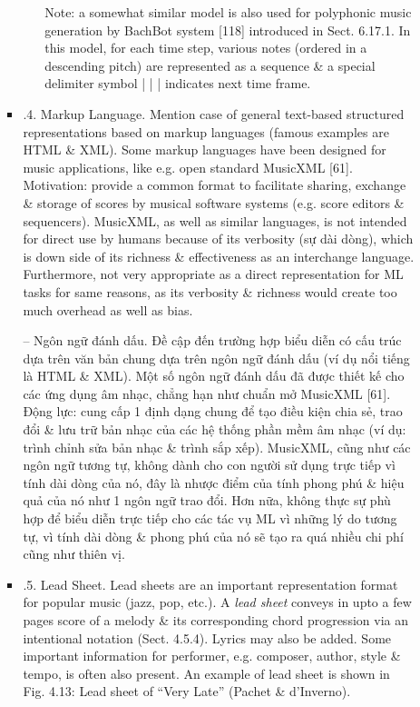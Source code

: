 \documentclass{article}
\begin{document}
\begin{itemize}
\begin{itemize}
\begin{itemize}
\begin{itemize}
				Note: a somewhat similar model is also used for polyphonic music generation by BachBot system [118] introduced in Sect. 6.17.1. In this model, for each time step, various notes (ordered in a descending pitch) are represented as a sequence \& a special delimiter symbol | | | indicates next time frame.
			\end{itemize}
			\item {.4. Markup Language.} Mention case of general text-based structured representations based on markup languages (famous examples are HTML \& XML). Some markup languages have been designed for music applications, like e.g. open standard MusicXML [61]. Motivation: provide a common format to facilitate sharing, exchange \& storage of scores by musical software systems (e.g. score editors \& sequencers). MusicXML, as well as similar languages, is not intended for direct use by humans because of its verbosity (sự dài dòng), which is down side of its richness \& effectiveness as an interchange language. Furthermore, not very appropriate as a direct representation for ML tasks for same reasons, as its verbosity \& richness would create too much overhead as well as bias.
			
			-- Ngôn ngữ đánh dấu. Đề cập đến trường hợp biểu diễn có cấu trúc dựa trên văn bản chung dựa trên ngôn ngữ đánh dấu (ví dụ nổi tiếng là HTML \& XML). Một số ngôn ngữ đánh dấu đã được thiết kế cho các ứng dụng âm nhạc, chẳng hạn như chuẩn mở MusicXML [61]. Động lực: cung cấp 1 định dạng chung để tạo điều kiện chia sẻ, trao đổi \& lưu trữ bản nhạc của các hệ thống phần mềm âm nhạc (ví dụ: trình chỉnh sửa bản nhạc \& trình sắp xếp). MusicXML, cũng như các ngôn ngữ tương tự, không dành cho con người sử dụng trực tiếp vì tính dài dòng của nó, đây là nhược điểm của tính phong phú \& hiệu quả của nó như 1 ngôn ngữ trao đổi. Hơn nữa, không thực sự phù hợp để biểu diễn trực tiếp cho các tác vụ ML vì những lý do tương tự, vì tính dài dòng \& phong phú của nó sẽ tạo ra quá nhiều chi phí cũng như thiên vị.
			\item {.5. Lead Sheet.} Lead sheets are an important representation format for popular music (jazz, pop, etc.). A {\it lead sheet} conveys in upto a few pages score of a melody \& its corresponding chord progression via an intentional notation (Sect. 4.5.4). Lyrics may also be added. Some important information for performer, e.g. composer, author, style \& tempo, is often also present. An example of lead sheet is shown in {\sf Fig. 4.13: Lead sheet of ``Very Late'' (Pachet \& d'Inverno).}
			

\end{itemize}
\end{itemize}
\end{itemize}
\end{document}
